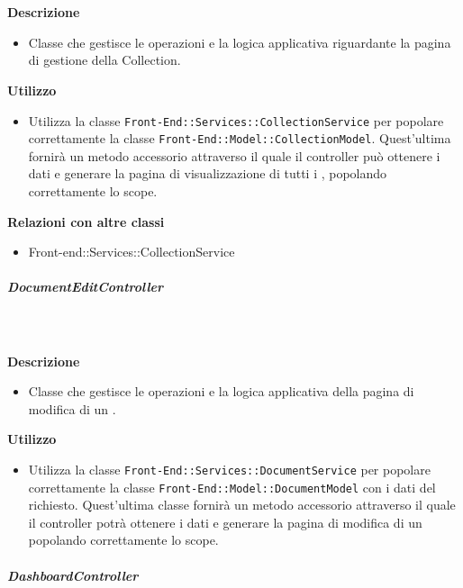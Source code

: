 				\textbf{\\ \\ Descrizione} 
					\begin{itemize}
						\item[] Classe che gestisce le operazioni e la logica applicativa riguardante la pagina di gestione della Collection.
					\end{itemize}      
				\textbf{Utilizzo}  
					\begin{itemize}
						\item[] Utilizza la classe \texttt{Front-End::Services::CollectionService} per popolare correttamente la classe \texttt{Front-End::Model::CollectionModel}. Quest'ultima fornirà un metodo accessorio attraverso il quale il controller può ottenere i dati e generare la pagina di visualizzazione di tutti i , popolando correttamente lo scope.
					\end{itemize}
					\textbf{Relazioni con altre classi}
					\begin{itemize}
							\item{Front-end::Services::CollectionService}
					\end{itemize}
			\subparagraph{DocumentEditController}
				
				\textbf{\\ \\ Descrizione} 
					\begin{itemize}
						\item[] Classe che gestisce le operazioni e la logica applicativa della pagina di modifica di un .
					\end{itemize}      
				\textbf{Utilizzo}  
					\begin{itemize}
						\item[] Utilizza la classe \texttt{Front-End::Services::DocumentService} per popolare correttamente la classe \texttt{Front-End::Model::DocumentModel} con i dati del  richiesto. Quest'ultima classe fornirà un metodo accessorio attraverso il quale il controller potrà ottenere i dati e generare la pagina di modifica di un  popolando correttamente lo scope.
					\end{itemize}
			\subparagraph{DashboardController}
				
